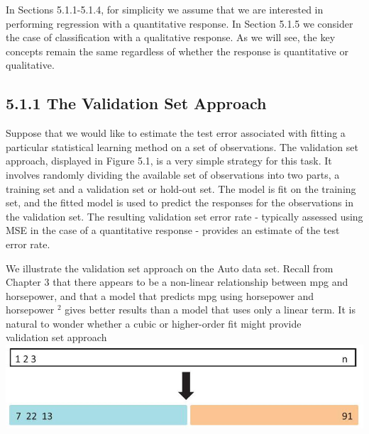 \documentclass[10pt]{article}
\begin{document}
In Sections 5.1.1-5.1.4, for simplicity we assume that we are interested in performing regression with a quantitative response. In Section 5.1.5 we consider the case of classification with a qualitative response. As we will see, the key concepts remain the same regardless of whether the response is quantitative or qualitative.

\subsection*{5.1.1 The Validation Set Approach}
Suppose that we would like to estimate the test error associated with fitting a particular statistical learning method on a set of observations. The validation set approach, displayed in Figure 5.1, is a very simple strategy for this task. It involves randomly dividing the available set of observations into two parts, a training set and a validation set or hold-out set. The model is fit on the training set, and the fitted model is used to predict the responses for the observations in the validation set. The resulting validation set error rate - typically assessed using MSE in the case of a quantitative response - provides an estimate of the test error rate.

We illustrate the validation set approach on the Auto data set. Recall from Chapter 3 that there appears to be a non-linear relationship between mpg and horsepower, and that a model that predicts mpg using horsepower and horsepower ${ }^{2}$ gives better results than a model that uses only a linear term. It is natural to wonder whether a cubic or higher-order fit might provide\\
validation set approach\\
\includegraphics[max width=\textwidth, center]{2025_05_05_efe77898333945044de4g-192}
\end{document}
